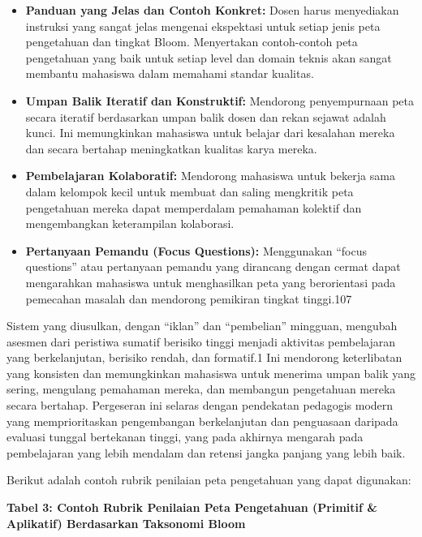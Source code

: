 \documentclass[
  letterpaper,
  DIV=11,
  numbers=noendperiod]{scrreprt}
\begin{document}
\begin{itemize}
\item
  \textbf{Panduan yang Jelas dan Contoh Konkret:} Dosen harus
  menyediakan instruksi yang sangat jelas mengenai ekspektasi untuk
  setiap jenis peta pengetahuan dan tingkat Bloom. Menyertakan
  contoh-contoh peta pengetahuan yang baik untuk setiap level dan domain
  teknis akan sangat membantu mahasiswa dalam memahami standar kualitas.
\item
  \textbf{Umpan Balik Iteratif dan Konstruktif:} Mendorong penyempurnaan
  peta secara iteratif berdasarkan umpan balik dosen dan rekan sejawat
  adalah kunci. Ini memungkinkan mahasiswa untuk belajar dari kesalahan
  mereka dan secara bertahap meningkatkan kualitas karya mereka.
\item
  \textbf{Pembelajaran Kolaboratif:} Mendorong mahasiswa untuk bekerja
  sama dalam kelompok kecil untuk membuat dan saling mengkritik peta
  pengetahuan mereka dapat memperdalam pemahaman kolektif dan
  mengembangkan keterampilan kolaborasi.
\item
  \textbf{Pertanyaan Pemandu (Focus Questions):} Menggunakan ``focus
  questions'' atau pertanyaan pemandu yang dirancang dengan cermat dapat
  mengarahkan mahasiswa untuk menghasilkan peta yang berorientasi pada
  pemecahan masalah dan mendorong pemikiran tingkat tinggi.107
\end{itemize}

Sistem yang diusulkan, dengan ``iklan'' dan ``pembelian'' mingguan,
mengubah asesmen dari peristiwa sumatif berisiko tinggi menjadi
aktivitas pembelajaran yang berkelanjutan, berisiko rendah, dan
formatif.1 Ini mendorong keterlibatan yang konsisten dan memungkinkan
mahasiswa untuk menerima umpan balik yang sering, mengulang pemahaman
mereka, dan membangun pengetahuan mereka secara bertahap. Pergeseran ini
selaras dengan pendekatan pedagogis modern yang memprioritaskan
pengembangan berkelanjutan dan penguasaan daripada evaluasi tunggal
bertekanan tinggi, yang pada akhirnya mengarah pada pembelajaran yang
lebih mendalam dan retensi jangka panjang yang lebih baik.

Berikut adalah contoh rubrik penilaian peta pengetahuan yang dapat
digunakan:

\textbf{Tabel 3: Contoh Rubrik Penilaian Peta Pengetahuan (Primitif \&
Aplikatif) Berdasarkan Taksonomi Bloom}
\end{document}
